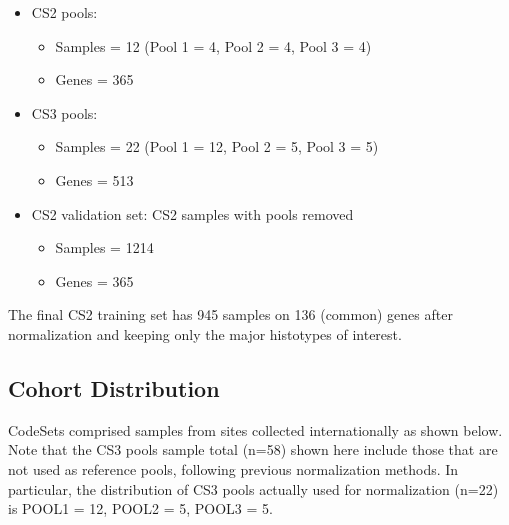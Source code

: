 \documentclass[
]{report}
\providecommand{\tightlist}{%
  \setlength{\itemsep}{0pt}\setlength{\parskip}{0pt}}
\begin{document}
\begin{itemize}
\item
  CS2 pools:

  \begin{itemize}
  \tightlist
  \item
    Samples = 12 (Pool 1 = 4, Pool 2 = 4, Pool 3 = 4)
  \item
    Genes = 365
  \end{itemize}
\item
  CS3 pools:

  \begin{itemize}
  \tightlist
  \item
    Samples = 22 (Pool 1 = 12, Pool 2 = 5, Pool 3 = 5)
  \item
    Genes = 513
  \end{itemize}
\item
  CS2 validation set: CS2 samples with pools removed

  \begin{itemize}
  \tightlist
  \item
    Samples = 1214
  \item
    Genes = 365
  \end{itemize}
\end{itemize}

The final CS2 training set has 945 samples on 136 (common) genes after normalization and keeping only the major histotypes of interest.

\hypertarget{cohort-distribution}{%
\subsection{Cohort Distribution}\label{cohort-distribution}}

CodeSets comprised samples from sites collected internationally as shown below. Note that the CS3 pools sample total (n=58) shown here include those that are not used as reference pools, following previous normalization methods. In particular, the distribution of CS3 pools actually used for normalization (n=22) is POOL1 = 12, POOL2 = 5, POOL3 = 5.
\end{document}
